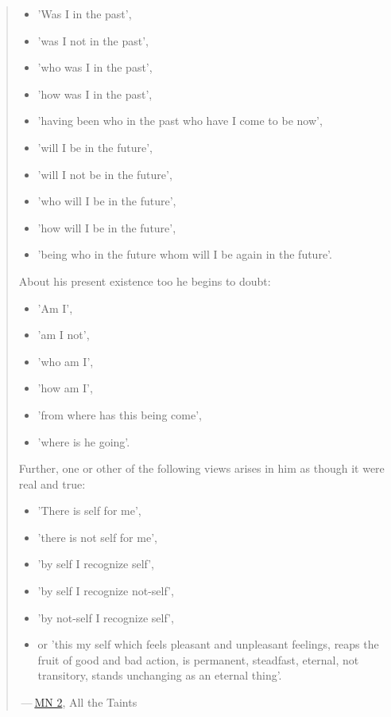 \begin{quote}
\begin{itemize}
\item
  'Was I in the past',
\item
  'was I not in the past',
\item
  'who was I in the past',
\item
  'how was I in the past',
\item
  'having been who in the past who have I come to be now',
\item
  'will I be in the future',
\item
  'will I not be in the future',
\item
  'who will I be in the future',
\item
  'how will I be in the future',
\item
  'being who in the future whom will I be again in the future'.
\end{itemize}

About his present existence too he begins to doubt:

\begin{itemize}
\item
  'Am I',
\item
  'am I not',
\item
  'who am I',
\item
  'how am I',
\item
  'from where has this being come',
\item
  'where is he going'.
\end{itemize}

Further, one or other of the following views arises in him as though it were real and true:

\begin{itemize}
\item
  'There is self for me',
\item
  'there is not self for me',
\item
  'by self I recognize self',
\item
  'by self I recognize not-self',
\item
  'by not-self I recognize self',
\item
  or 'this my self which feels pleasant and unpleasant feelings, reaps the fruit of good and bad action, is permanent, steadfast, eternal, not transitory, stands unchanging as an eternal thing'.
\end{itemize}

 --- \href{https://suttacentral.net/mn2/en/bodhi}{MN 2}, All the Taints
\end{quote}

